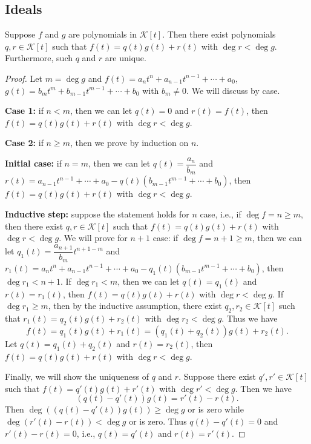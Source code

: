 \documentclass{ctexart}
\begin{document}
    \subsection{Ideals}
    \begin{mythm}
        Suppose $f$ and $g$ are polynomials in $\mathcal K[t]$. Then there exist polynomials $q,r\in \mathcal K[t]$ such that $f(t) = q(t) g(t) + r(t)$ with $\deg r < \deg g$. Furthermore, such $q$ and $r$ are unique.
    \end{mythm}
    \begin{proof}
        Let $m = \deg g$ and $f(t) = a_n t^n + a_{n-1} t^{n-1} + \cdots + a_0$, $g(t) = b_m t^m + b_{m-1} t^{m-1} + \cdots + b_0$ with $b_m \ne 0$. We will discuss by case.

        \textbf{Case 1:} if $n < m$, then we can let $q(t) = 0$ and $r(t) = f(t)$, then $f(t) = q(t) g(t) + r(t)$ with $\deg r < \deg g$.

        \textbf{Case 2:} if $n \ge m$, then we prove by induction on $n$.

        \textbf{Initial case:} if $n=m$, then we can let $q(t) = \dfrac{a_n}{b_m}$ and $r(t) = a_{n-1} t^{n-1} + \cdots + a_0 - q(t)(b_{m-1} t^{m-1} + \cdots + b_0)$, then $f(t) = q(t) g(t) + r(t)$ with $\deg r < \deg g$.

        \textbf{Inductive step:} suppose the statement holds for $n$ case, i.e., if $\deg f = n \ge m$, then there exist $q,r\in \mathcal K[t]$ such that $f(t) = q(t) g(t) + r(t)$ with $\deg r < \deg g$. We will prove for $n+1$ case: if $\deg f = n+1 \ge m$, then we can let $q_1(t) = \dfrac{a_{n+1}}{b_m} t^{n+1-m}$ and $r_1(t) = a_n t^n + a_{n-1} t^{n-1} + \cdots + a_0 - q_1(t)(b_{m-1} t^{m-1} + \cdots + b_0)$, then $\deg r_1 < n+1$. If $\deg r_1 < m$, then we can let $q(t) = q_1(t)$ and $r(t) = r_1(t)$, then $f(t) = q(t) g(t) + r(t)$ with $\deg r < \deg g$. If $\deg r_1 \ge m$, then by the inductive assumption, there exist $q_2, r_2\in \mathcal K[t]$ such that $r_1(t) = q_2(t) g(t) + r_2(t)$ with $\deg r_2 < \deg g$. Thus we have
        $$ f(t) = q_1(t) g(t) + r_1(t) = (q_1(t) + q_2(t)) g(t) + r_2(t). $$
        Let $q(t) = q_1(t) + q_2(t)$ and $r(t) = r_2(t)$, then $f(t) = q(t) g(t) + r(t)$ with $\deg r < \deg g$.

        Finally, we will show the uniqueness of $q$ and $r$. Suppose there exist $q', r' \in \mathcal K[t]$ such that $f(t) = q'(t) g(t) + r'(t)$ with $\deg r' < \deg g$. Then we have
        $$ (q(t) - q'(t)) g(t) = r'(t) - r(t). $$
        Then $\deg ((q(t) - q'(t)) g(t)) \ge \deg g$ or is zero while $\deg (r'(t) - r(t)) < \deg g$ or is zero. Thus $q(t) - q'(t) = 0$ and $r'(t) - r(t) = 0$, i.e., $q(t) = q'(t)$ and $r(t) = r'(t)$.
    \end{proof}
\end{document}
